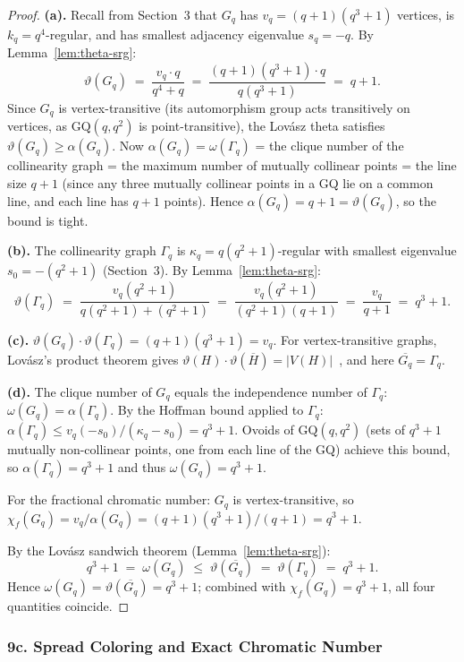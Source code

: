 \documentclass{article}
\theoremstyle{definition}
\begin{document}
\begin{proof}
\textbf{(a).}  Recall from Section~3 that $G_q$ has $v_q=(q+1)(q^3+1)$ vertices, is $k_q=q^4$-regular, and has smallest adjacency eigenvalue $s_q=-q$.  By Lemma~\ref{lem:theta-srg}:
\[
  \vartheta(G_q) \;=\; \frac{v_q\cdot q}{q^4+q} \;=\; \frac{(q+1)(q^3+1)\cdot q}{q(q^3+1)} \;=\; q+1.
\]
Since $G_q$ is vertex-transitive (its automorphism group acts transitively on vertices, as $\mathrm{GQ}(q,q^2)$ is point-transitive), the Lov\'asz theta satisfies $\vartheta(G_q)\ge\alpha(G_q)$.  Now $\alpha(G_q)=\omega(\Gamma_q)$ = the clique number of the collinearity graph = the maximum number of mutually collinear points = the line size $q+1$ (since any three mutually collinear points in a GQ lie on a common line, and each line has $q+1$ points).  Hence $\alpha(G_q)=q+1=\vartheta(G_q)$, so the bound is tight.

\textbf{(b).}  The collinearity graph $\Gamma_q$ is $\kappa_q=q(q^2+1)$-regular with smallest eigenvalue $s_0=-(q^2+1)$ (Section~3).  By Lemma~\ref{lem:theta-srg}:
\[
  \vartheta(\Gamma_q) \;=\; \frac{v_q(q^2+1)}{q(q^2+1)+(q^2+1)} \;=\; \frac{v_q(q^2+1)}{(q^2+1)(q+1)} \;=\; \frac{v_q}{q+1} \;=\; q^3+1.
\]

\textbf{(c).}  $\vartheta(G_q)\cdot\vartheta(\Gamma_q)=(q+1)(q^3+1)=v_q$.  For vertex-transitive graphs, Lov\'asz's product theorem gives $\vartheta(H)\cdot\vartheta(\overline{H})=|V(H)|$~\cite{Lovasz1979}, and here $\overline{G_q}=\Gamma_q$.

\textbf{(d).}  The clique number of $G_q$ equals the independence number of $\Gamma_q$: $\omega(G_q)=\alpha(\Gamma_q)$.  By the Hoffman bound applied to $\Gamma_q$: $\alpha(\Gamma_q)\le v_q(-s_0)/(\kappa_q-s_0)=q^3+1$.  Ovoids of $\mathrm{GQ}(q,q^2)$ (sets of $q^3+1$ mutually non-collinear points, one from each line of the GQ) achieve this bound, so $\alpha(\Gamma_q)=q^3+1$ and thus $\omega(G_q)=q^3+1$.

For the fractional chromatic number: $G_q$ is vertex-transitive, so $\chi_f(G_q)=v_q/\alpha(G_q)=(q+1)(q^3+1)/(q+1)=q^3+1$.

By the Lov\'asz sandwich theorem (Lemma~\ref{lem:theta-srg}):
\[
  q^3+1 \;=\;\omega(G_q)\;\le\;\vartheta(\overline{G_q})\;=\;\vartheta(\Gamma_q)\;=\;q^3+1.
\]
Hence $\omega(G_q)=\vartheta(\overline{G_q})=q^3+1$; combined with $\chi_f(G_q)=q^3+1$, all four quantities coincide.
\end{proof}

\subsubsection*{9c. Spread Coloring and Exact Chromatic Number}
\end{document}

